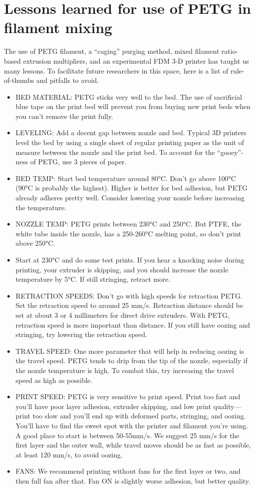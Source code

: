 \section{Lessons learned for use of PETG in filament mixing}
The use of PETG filament, a ``caging'' purging method, mixed filament ratio-based extrusion multipliers, and an experimental FDM 3-D printer has taught us many lessons. To facilitate future researchers in this space, here is a list of rule-of-thumbs and pitfalls to avoid. 

\begin{itemize}
    \item BED MATERIAL: PETG sticks very well to the bed. The use of sacrificial blue tape on the print bed will prevent you from buying new print beds when you can’t remove the print fully. \item LEVELING: Add a decent gap between nozzle and bed. Typical 3D printers level the bed by using a single sheet of regular printing paper as the unit of measure between the nozzle and the print bed. To account for the “gooey”-ness of PETG, use 3 pieces of paper.
    \item BED TEMP: Start bed temperature around 80°C. Don't go above 100°C (90°C is probably the highest). Higher is better for bed adhesion, but PETG already adheres pretty well. Consider lowering your nozzle before increasing the temperature. 
    \item NOZZLE TEMP: PETG prints between 230°C and 250°C. But PTFE, the white tube inside the nozzle, has a 250-260°C melting point, so don't print above 250°C.
    \item Start at 230°C and do some test prints. If you hear a knocking noise during printing, your extruder is skipping, and you should increase the nozzle temperature by 5°C. If still stringing, retract more.
    \item RETRACTION SPEEDS: Don’t go with high speeds for retraction PETG. Set the retraction speed to around 25 mm/s. Retraction distance should be set at about 3 or 4 millimeters for direct drive extruders. With PETG, retraction speed is more important than distance. If you still have oozing and stringing, try lowering the retraction speed.
    \item TRAVEL SPEED: One more parameter that will help in reducing oozing is the travel speed. PETG tends to drip from the tip of the nozzle, especially if the nozzle temperature is high. To combat this, try increasing the travel speed as high as possible.
    \item PRINT SPEED: PETG is very sensitive to print speed. Print too fast and you’ll have poor layer adhesion, extruder skipping, and low print quality—print too slow and you’ll end up with deformed parts, stringing, and oozing. You’ll have to find the sweet spot with the printer and filament you’re using. A good place to start is between 50-55mm/s. We suggest 25 mm/s for the first layer and the outer wall, while travel moves should be as fast as possible, at least 120 mm/s, to avoid oozing.
    \item FANS: We recommend printing without fans for the first layer or two, and then full fan after that. Fan ON is slightly worse adhesion, but better quality.
\end{itemize}


